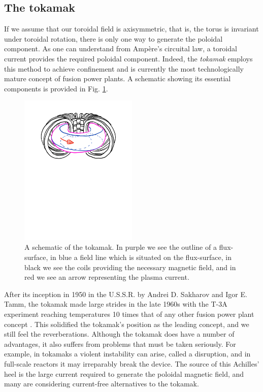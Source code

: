\subsection{The tokamak}
If we assume that our toroidal field is axisymmetric, that is, the torus is invariant under toroidal rotation, there is only one way to generate the poloidal component. As one can understand from Amp\`ere's circuital law, a toroidal current provides the required poloidal component. Indeed, the \textit{tokamak} employs this method to achieve confinement and is currently the most technologically mature concept of fusion power plants. A schematic showing its essential components is provided in Fig. \ref{fig: tokamak schematic}.
\begin{figure}
    \centering
    \includegraphics[width=0.5\textwidth]{3_chapters/0_introduction/img/tokamak-sketch.pdf}
    \caption{A schematic of the tokamak. In purple we see the outline of a flux-surface, in blue a field line which is situated on the flux-surface, in black we see the coils providing the necessary magnetic field, and in red we see an arrow representing the plasma current.}
    \label{fig: tokamak schematic}
\end{figure}
\par 
After its inception in 1950 in the U.S.S.R. by Andrei D. Sakharov and Igor E. Tamm, the tokamak made large strides in the late 1960s with the T-3A experiment reaching temperatures 10 times that of any other fusion power plant concept \cite{azizov2012tokamaks}. This solidified the tokamak's position as the leading concept, and we still feel the reverberations. Although the tokamak does have a number of advantages, it also suffers from problems that must be taken seriously. For example, in tokamaks a violent instability can arise, called a disruption, and in full-scale reactors it may irreparably break the device. The source of this Achilles' heel is the large current required to generate the poloidal magnetic field, and many are considering current-free alternatives to the tokamak.

